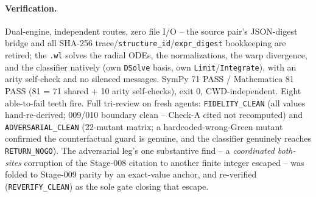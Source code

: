 \paragraph{Verification.}
Dual-engine, independent routes, zero file I/O -- the source pair's JSON-digest
bridge and all SHA-256 trace/\texttt{structure\_id}/\texttt{expr\_digest}
bookkeeping are retired; the \texttt{.wl} solves the radial ODEs, the
normalizations, the warp divergence, and the classifier natively (own
\texttt{DSolve} basis, own \texttt{Limit}/\texttt{Integrate}), with an arity
self-check and no silenced messages. SymPy 71 PASS / Mathematica 81 PASS (81 =
71 shared + 10 arity self-checks), exit 0, CWD-independent. Eight able-to-fail
teeth fire. Full tri-review on fresh agents: \texttt{FIDELITY\_CLEAN} (all
values hand-re-derived; 009/010 boundary clean -- Check-A cited not recomputed)
and \texttt{ADVERSARIAL\_CLEAN} (22-mutant matrix; a hardcoded-wrong-Green
mutant confirmed the counterfactual guard is genuine, and the classifier
genuinely reaches \texttt{RETURN\_NOGO}). The adversarial leg's one substantive
find -- a \emph{coordinated both-sites} corruption of the Stage-008 citation to
another finite integer escaped -- was folded to Stage-009 parity by an
exact-value anchor, and re-verified (\texttt{REVERIFY\_CLEAN}) as the sole gate
closing that escape.
